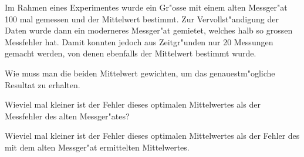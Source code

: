 Im Rahmen eines Experimentes wurde ein Gr"osse mit einem alten Messger"at
100 mal gemessen und der Mittelwert bestimmt.
Zur Vervollst"andigung der Daten wurde dann ein moderneres Messger"at
gemietet, welches halb so grossen Messfehler hat.
Damit konnten jedoch aus Zeitgr"unden nur 20 Messungen gemacht werden,
von denen ebenfalls der Mittelwert bestimmt wurde.
\begin{teilaufgaben}
\item
Wie muss man die beiden Mittelwert gewichten, um das genauestm"ogliche
Resultat zu erhalten.
\item
Wieviel mal kleiner ist der Fehler dieses optimalen Mittelwertes als 
der Messfehler des alten Messger"ates?
\item
Wieviel mal kleiner ist der Fehler dieses optimalen Mittelwertes als
der Fehler des mit dem alten Messger"at ermittelten Mittelwertes.
\end{teilaufgaben}

